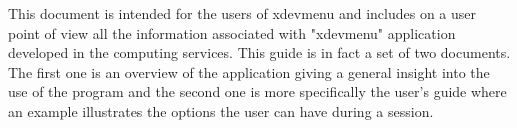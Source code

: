 %
%
%
%
%
%
%
%
%
%
This document is intended for the users of xdevmenu and 
includes on a user point of view all the information associated with "xdevmenu"
application developed in the computing services. This guide is in fact a
set of two documents. The first one is an
overview of the application giving a general insight into the use of 
the program and the second one is more specifically the user's guide where an 
example illustrates the options the user can have during a session. 

